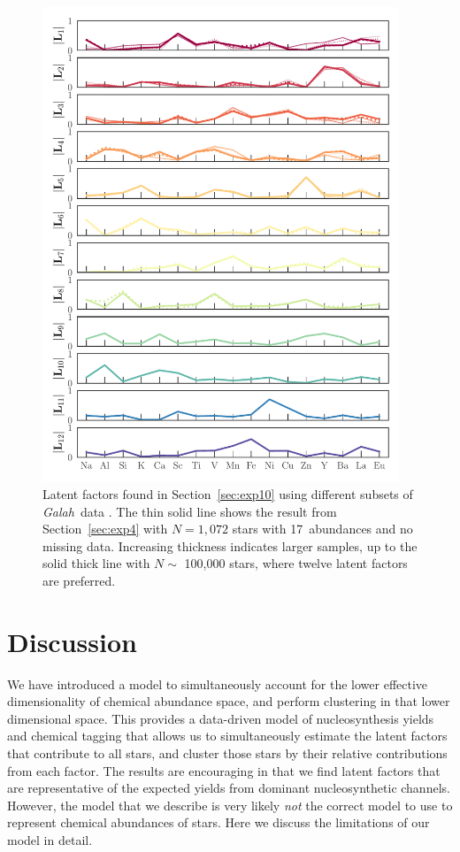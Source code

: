 \documentclass[twocolumn]{aastex62}
\newcommand{\project}[1]{\textsl{#1}}
\newcommand{\Galah}{\project{Galah}}
\newcommand{\ExpThreeNumAbundances}{17}
\begin{document}
\begin{figure}[t!]
	\includegraphics[width=0.95\textwidth]{experiments/exp10-comparison.pdf}
	\caption{Latent factors found in Section~\ref{sec:exp10} using different subsets
	         of \Galah\ data \citep{Buder:2018}. The thin solid line shows the result from
	         Section~\ref{sec:exp4} with $N=1,072$ stars with \ExpThreeNumAbundances\ abundances and no
	         missing data. Increasing thickness indicates larger samples, up to the solid thick line with $N \sim$ 100,000 stars, where twelve latent factors are preferred.}
    \label{fig:exp10-comparison}
\end{figure}


\vspace{1em}
\section{Discussion} \label{sec:discussion}

We have introduced a model to simultaneously account for the lower
effective dimensionality of chemical abundance space, and perform clustering
in that lower dimensional space. This provides a data-driven model of
nucleosynthesis yields and chemical tagging that allows us to simultaneously
estimate the latent factors that contribute to all stars, and cluster those 
stars by their relative contributions from each factor. The results are
encouraging in that we find latent factors that are representative of the
expected yields from dominant nucleosynthetic channels. However, the model that
we describe is very likely \emph{not} the correct model to use to represent 
chemical abundances of stars. Here we discuss the limitations of our model 
in detail.
\end{document}

